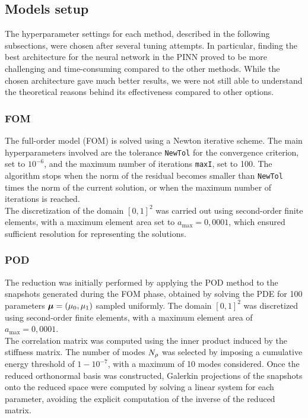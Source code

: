 \documentclass[
    conference,
    nofonttune,
    11pt
]{IEEEtran}
\begin{document}
        \subsection{Models setup}

            The hyperparameter settings for each method, described in the following subsections, were chosen after several tuning attempts. In particular, finding the best architecture for the neural network in the PINN proved to be more challenging and time-consuming compared to the other methods. While the chosen architecture gave much better results, we were not still able to understand the theoretical reasons behind its effectiveness compared to other options.

            \subsubsection{FOM}
                The full-order model (FOM) is solved using a Newton iterative scheme. The main hyperparameters involved are the tolerance \texttt{NewTol} for the convergence criterion, set to $10^{-6}$, and the maximum number of iterations \texttt{maxI}, set to 100. The algorithm stops when the norm of the residual becomes smaller than \texttt{NewTol} times the norm of the current solution, or when the maximum number of iterations is reached.\\
                The discretization of the domain $[0,1]^2$ was carried out using second-order finite elements, with a maximum element area set to $a_{\text{max}} = 0{,}0001$, which ensured sufficient resolution for representing the solutions.
            
            \subsubsection{POD}
            
                The reduction was initially performed by applying the POD method to the snapshots generated during the FOM phase, obtained by solving the PDE for 100 parameters ${\boldsymbol\mu} = (\mu_0, \mu_1)$ sampled uniformly. The domain $[0,1]^2$ was discretized using second-order finite elements, with a maximum element area of $a_{\text{max}} = 0{,}0001$.\\ 
                The correlation matrix was computed using the inner product induced by the stiffness matrix. The number of modes ${N_\rho}$ was selected by imposing a cumulative energy threshold of $1 - 10^{-7}$, with a maximum of 10 modes considered.
                Once the reduced orthonormal basis was constructed, Galerkin projections of the snapshots onto the reduced space were computed by solving a linear system for each parameter, avoiding the explicit computation of the inverse of the reduced matrix.
            
\end{document}
